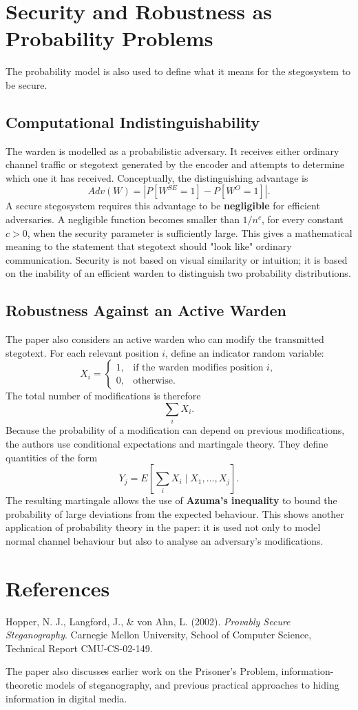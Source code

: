 \documentclass[14pt]{article}
\begin{document}
\section{Security and Robustness as Probability Problems}
The probability model is also used to define what it means for the stegosystem to be secure.
\subsection{Computational Indistinguishability}
The warden is modelled as a probabilistic adversary. It receives either ordinary channel traffic or stegotext generated by the encoder and attempts to determine which one it has received.
Conceptually, the distinguishing advantage is
\[
Adv(W)
 =
\left|
P[W^{SE} =1]
-
P[W^O=1]
\right|.\]
A secure stegosystem requires this advantage to be \textbf{negligible} for efficient adversaries.
A negligible function becomes smaller than \(1/n^c\), for every constant \(c>0\), when the security parameter is sufficiently large.
This gives a mathematical meaning to the statement that stegotext should "look like" ordinary communication. Security is not based on visual similarity or intuition; it is based on the inability of an efficient warden to distinguish two probability distributions.
\subsection{Robustness Against an Active Warden}
The paper also considers an active warden who can modify the transmitted stegotext.
For each relevant position \(i\), define an indicator random variable:
\[
X_i=
\begin{cases}
1,&\text{if the warden modifies position }i,\\
0,&\text{otherwise}.
\end{cases}
\]
The total number of modifications is therefore
\[
\sum_iX_i.
\]
Because the probability of a modification can depend on previous modifications, the authors use conditional expectations and martingale theory. They define quantities of the form
\[
Y_j=
E\left[
\sum_iX_i
\mid
X_1,\ldots,X_j
\right].
\]
The resulting martingale allows the use of \textbf{Azuma's inequality} to bound the probability of large deviations from the expected behaviour.
This shows another application of probability theory in the paper: it is used not only to model normal channel behaviour but also to analyse an adversary's modifications.


\section{References}
Hopper, N. J., Langford, J., \& von Ahn, L. (2002). \textit{Provably Secure Steganography}. Carnegie Mellon University, School of Computer Science, Technical Report CMU-CS-02-149.

The paper also discusses earlier work on the Prisoner's Problem, information-theoretic models of steganography, and previous practical approaches to hiding information in digital media.
\end{document}
